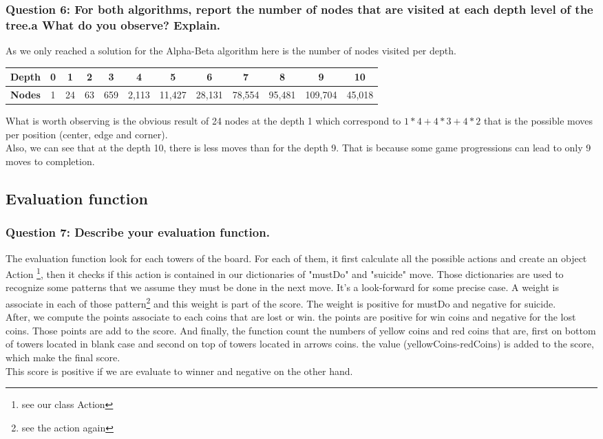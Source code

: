 \documentclass[a4paper,10pt]{article}
\begin{document}
			\subsubsection{Question 6: For both algorithms, report the number of nodes that are visited at each depth level of the tree.a What do you observe? Explain.}
				As we only reached a solution for the Alpha-Beta algorithm here is the number of nodes visited per depth.
				\begin{center}
					\begin{tabular}{|c|c|c|c|c|c|c|c|c|c|c|c|}
						\hline 
						\textbf{Depth} & 0 & 1 & 2 & 3 & 4 & 5 & 6 & 7 & 8 & 9 & 10 \\ 
						\hline 
						\textbf{Nodes} & 1 & 24 & 63 & 659 & 2,113 & 11,427 & 28,131 & 78,554 & 95,481 & 109,704 & 45,018 \\ 
						\hline 
					\end{tabular} 
				\end{center}
				What is worth observing is the obvious result of 24 nodes at the depth 1 which correspond to $ 1*4 + 4*3 + 4*2 $ that is the possible moves per position (center, edge and corner).\\
				Also, we can see that at the depth 10, there is less moves than for the depth 9. That is because some game progressions can lead to only 9 moves to completion.
			
			\subsection{Evaluation function}
				\subsubsection{Question 7: Describe your evaluation function.}
				The evaluation function look for each towers of the board. For each of them, it first calculate all the possible actions and create an object Action \footnote{see our class Action}, then it checks if this action is contained in our dictionaries of "mustDo" and "suicide" move. Those dictionaries are used to recognize some patterns that we assume they must be done in the next move. It's a look-forward for some precise case. A weight is associate in each of those pattern\footnote{see the action again} and this weight is part of the score. The weight is positive for mustDo and negative for suicide.\\
After, we compute the points associate to each coins that are lost or win. the points are positive for win coins and negative for the lost coins. Those points are add to the score.
And finally, the function count the numbers of yellow coins and red coins that are, first on bottom of towers located in blank case and second on top of towers located in arrows coins. the value (yellowCoins-redCoins) is added to the score, which make the final score.\\
This score is positive if we are evaluate to winner and negative on the other hand.
\end{document}
